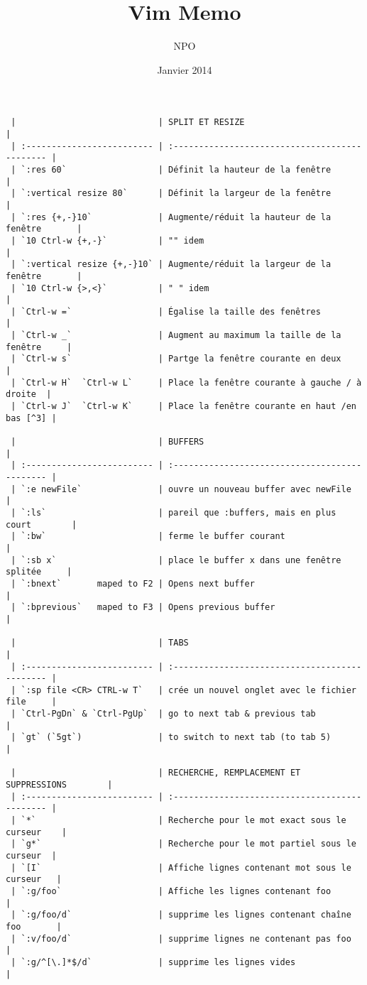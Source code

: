 \documentclass[10pt,landscape]{article}
\title{Vim Memo}
\author{NPO}
\date{Janvier 2014}
\begin{document}

\begin{multicols}{2}
\begin{verbatim}
 |                            | SPLIT ET RESIZE                                |
 | :------------------------- | :--------------------------------------------- |
 | `:res 60`                  | Définit la hauteur de la fenêtre               |
 | `:vertical resize 80`      | Définit la largeur de la fenêtre               |
 | `:res {+,-}10`             | Augmente/réduit la hauteur de la fenêtre       |
 | `10 Ctrl-w {+,-}`          | "" idem                                        |
 | `:vertical resize {+,-}10` | Augmente/réduit la largeur de la fenêtre       |
 | `10 Ctrl-w {>,<}`          | " " idem                                       |
 | `Ctrl-w =`                 | Égalise la taille des fenêtres                 |
 | `Ctrl-w _`                 | Augment au maximum la taille de la fenêtre     |
 | `Ctrl-w s`                 | Partge la fenêtre courante en deux             |
 | `Ctrl-w H`  `Ctrl-w L`     | Place la fenêtre courante à gauche / à droite  |
 | `Ctrl-w J`  `Ctrl-w K`     | Place la fenêtre courante en haut /en bas [^3] |

 |                            | BUFFERS                                        |
 | :------------------------- | :--------------------------------------------- |
 | `:e newFile`               | ouvre un nouveau buffer avec newFile           |
 | `:ls`                      | pareil que :buffers, mais en plus court        |
 | `:bw`                      | ferme le buffer courant                        |
 | `:sb x`                    | place le buffer x dans une fenêtre splitée     |
 | `:bnext`       maped to F2 | Opens next buffer                              |
 | `:bprevious`   maped to F3 | Opens previous buffer                          |

 |                            | TABS                                           |
 | :------------------------- | :--------------------------------------------- |
 | `:sp file <CR> CTRL-w T`   | crée un nouvel onglet avec le fichier file     |
 | `Ctrl-PgDn` & `Ctrl-PgUp`  | go to next tab & previous tab                  |
 | `gt` (`5gt`)               | to switch to next tab (to tab 5)               |

 |                            | RECHERCHE, REMPLACEMENT ET SUPPRESSIONS        |
 | :------------------------- | :--------------------------------------------- |
 | `*`                        | Recherche pour le mot exact sous le curseur    |
 | `g*`                       | Recherche pour le mot partiel sous le curseur  |
 | `[I`                       | Affiche lignes contenant mot sous le curseur   |
 | `:g/foo`                   | Affiche les lignes contenant foo               |
 | `:g/foo/d`                 | supprime les lignes contenant chaîne foo       |
 | `:v/foo/d`                 | supprime lignes ne contenant pas foo           |
 | `:g/^[\.]*$/d`             | supprime les lignes vides                      |


\end{verbatim}
\end{multicols}
\end{document}
